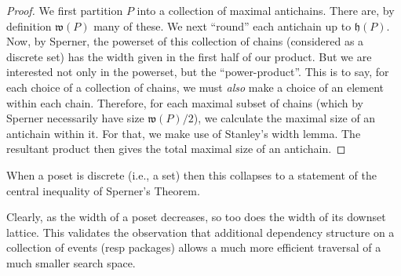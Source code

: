 \documentclass[hoptionsi,review,screen,format=sigconf]{acmart}
\newtheorem{lemma}[theorem]{Lemma}
\theoremstyle{definition}
\newcommand{\Wf}{\mathfrak{w}}
\newcommand{\Hf}{\mathfrak{h}}
\begin{document}
\begin{proof} 
We first partition \(P\) into a collection of maximal antichains. There are, by definition \(\Wf(P)\) many of these. We next ``round'' each antichain up to \(\Hf(P)\). Now, by Sperner, the powerset of this collection of chains (considered as a discrete set) has the width given in the first half of our product. But we are interested not only in the powerset, but the ``power-product''. This is to say, for each choice of a collection of chains, we must \textit{also} make a choice of an element within each chain. Therefore, for each maximal subset of chains (which by Sperner necessarily have size \(\Wf(P)/2\)), we calculate the maximal size of an antichain within it. For that, we make use of Stanley's width lemma. The resultant product then gives the total maximal size of an antichain.
\end{proof}

When a poset is discrete (i.e., a set) then this collapses to a statement of the central inequality of Sperner's Theorem.

Clearly, as the width of a poset decreases, so too does the width of its downset lattice. This validates the observation that additional dependency structure on a collection of events (resp packages) allows a much more efficient traversal of a much smaller search space.










\end{document}
